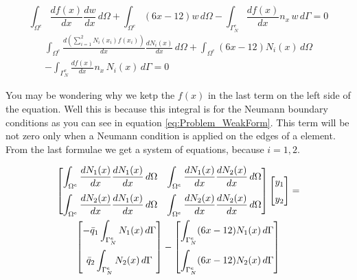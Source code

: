 \documentclass[letterpaper,10pt]{article}
\begin{document}
\begin{small}
\[
\int_{\Omega^e} \frac{d f(x)}{d x} \frac{d w}{d x} \, d\Omega + \int_{\Omega^e} (6x-12) w \, d\Omega - \int_{\Gamma_N^e} \frac{d f(x)}{d x} n_x \, w \, d\Gamma = 0
\]
\begin{multline}
\int_{\Omega^e} \frac{d \left( \sum_{i=1}^2 N_i(x_i)  f(x_i) \right) }{d x} \frac{d N_i(x)}{d x} \, d\Omega + \int_{\Omega^e} (6x-12) N_i(x)\, d\Omega \\
- \int_{\Gamma_N^e} \frac{d f(x)}{d x} n_x \, N_i(x) \, d\Gamma = 0
\end{multline}
\end{small}

You may be wondering why we ketp the $f(x)$ in the last term on the left side of the equation. Well this is because this integral is for the Neumann boundary conditions as you can see in equation \ref{eq:Problem_WeakForm}. This term will be not zero only when a Neumann condition is applied on the edges of a element. From the last formulae we get a system of equations, because $i=1,2$.

\begin{multline}
\begin{bmatrix}
\displaystyle
\int_{\Omega^e} \frac{d N_1(x)}{d x} \frac{d N_1(x)}{d x} \, d\Omega &
\displaystyle
\int_{\Omega^e} \frac{d N_1(x)}{d x} \frac{d N_2(x)}{d x} \, d\Omega \vspace{2mm} \\
\displaystyle
\int_{\Omega^e} \frac{d N_2(x)}{d x} \frac{d N_1(x)}{d x} \, d\Omega &
\displaystyle
\int_{\Omega^e} \frac{d N_2(x)}{d x} \frac{d N_2(x)}{d x} \, d\Omega
\end{bmatrix}
\begin{bmatrix}
y_1 \vspace{2mm}\\
y_2
\end{bmatrix}
= \\
\begin{bmatrix}
\displaystyle
-\bar{q}_1 \int_{\Gamma_N^e} N_1(x) \, d\Gamma \vspace{2mm}\\
\displaystyle
\bar{q}_2 \int_{\Gamma_N^e} N_2(x) \, d\Gamma
\end{bmatrix}
-
\begin{bmatrix}
\displaystyle
\int_{\Gamma_N^e} (6x-12) N_1(x) \, d\Gamma \vspace{2mm}\\
\displaystyle
\int_{\Gamma_N^e} (6x-12) N_2(x) \, d\Gamma
\end{bmatrix}
\label{eq:SystemEq_Element}
\end{multline}
\end{document}
